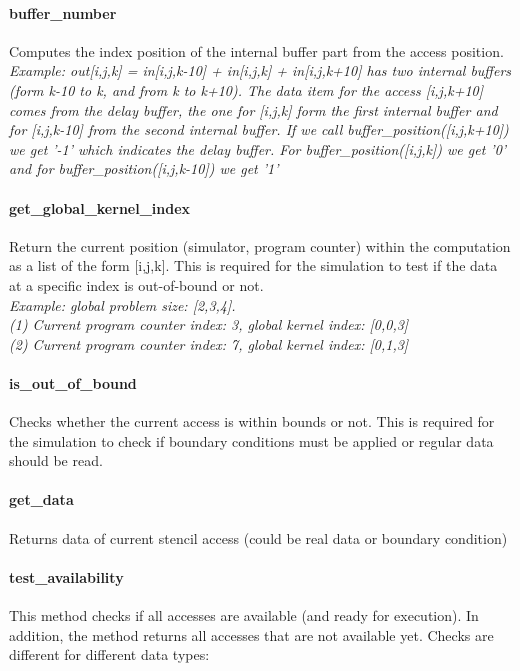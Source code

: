 \paragraph{buffer\_number}
Computes the index position of the internal buffer part from the access position. \\
\textit{Example: out[i,j,k] = in[i,j,k-10] + in[i,j,k] + in[i,j,k+10] has two internal buffers (form k-10 to k, and from k to k+10). The data item for the access [i,j,k+10] comes from the delay buffer, the one for [i,j,k] form the first internal buffer and for [i,j,k-10] from the second internal buffer. If we call buffer\_position([i,j,k+10]) we get '-1' which indicates the delay buffer. For buffer\_position([i,j,k]) we get '0' and for buffer\_position([i,j,k-10]) we get '1'}


\paragraph{get\_global\_kernel\_index}
Return the current position (simulator, program counter) within the computation as a list of the form [i,j,k]. This is required for the simulation to test if the data at a specific index is out-of-bound or not.\\
\textit{Example: global problem size: [2,3,4]. \\
	(1) Current program counter index: 3, global kernel index: [0,0,3] \\
	(2) Current program counter index: 7, global kernel index: [0,1,3]}


\paragraph{is\_out\_of\_bound}
Checks whether the current access is within bounds or not. This is required for the simulation to check if boundary conditions must be applied or regular data should be read.


\paragraph{get\_data}
Returns data of current stencil access (could be real data or boundary condition)


\paragraph{test\_availability}
This method checks if all accesses are available (and ready for execution). In addition, the method returns all accesses that are not available yet. Checks are different for different data types:

